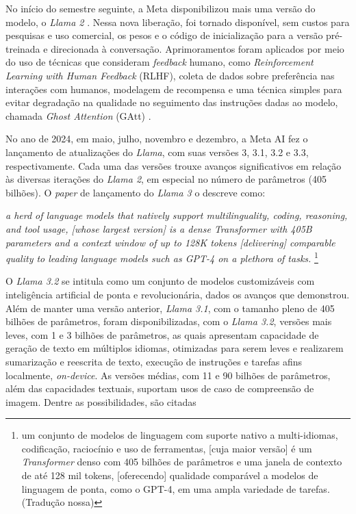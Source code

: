 No início do semestre seguinte, a Meta disponibilizou mais uma versão do modelo, o \textit{Llama 2} \cite{Llama:3}. Nessa nova liberação, foi tornado disponível, sem custos para pesquisas e uso comercial, os pesos e o código de inicialização para a versão pré-treinada e direcionada à conversação. Aprimoramentos foram aplicados por meio do uso de técnicas que consideram \textit{feedback} humano, como \textit{Reinforcement Learning with Human Feedback} (RLHF), coleta de dados sobre preferência nas interações com humanos,  modelagem de recompensa e uma técnica simples para evitar degradação na qualidade no seguimento das instruções dadas ao modelo, chamada \textit{Ghost Attention} (GAtt) \cite{Llama:4}.

No ano de 2024, em maio, julho, novembro e dezembro, a Meta AI fez o lançamento de atualizações do \textit{Llama}, com suas versões 3, 3.1, 3.2 e 3.3, respectivamente. Cada uma das versões trouxe avanços significativos em relação às diversas iterações do \textit{Llama 2}, em especial no número de parâmetros (405 bilhões). O \textit{paper} de lançamento do \textit{Llama 3} o descreve como:
\begin{citacao}
    \textit{a herd of language models that natively support multilinguality, coding, reasoning, and tool usage, [whose largest version] is a dense Transformer with 405B parameters and a context window of up to 128K tokens [delivering] comparable quality to leading language models such as GPT-4 on a plethora of tasks.} \cite{Llama:5} \footnote{um conjunto de modelos de linguagem com suporte nativo a multi-idiomas, codificação, raciocínio e uso de ferramentas, [cuja maior versão] é um \textit{Transformer} denso com 405 bilhões de parâmetros e uma janela de contexto de até 128 mil tokens, [oferecendo] qualidade comparável a modelos de linguagem de ponta, como o GPT-4, em uma ampla variedade de tarefas. (Tradução nossa)}
\end{citacao}


O \textit{Llama 3.2} se intitula como um conjunto de modelos customizáveis com inteligência artificial de ponta e revolucionária, dados os avanços que demonstrou. Além de manter uma versão anterior, \textit{Llama 3.1}, com o tamanho pleno de 405 bilhões de parâmetros, foram disponibilizadas, com o \textit{Llama 3.2}, versões mais leves, com 1 e 3 bilhões de parâmetros, as quais apresentam capacidade de geração de texto em múltiplos idiomas, otimizadas para serem leves e realizarem sumarização e reescrita de texto, execução de instruções e tarefas afins localmente, \textit{on-device}. As versões médias, com 11 e 90 bilhões de parâmetros, além das capacidades textuais, suportam usos de caso de compreensão de imagem. Dentre as possibilidades, são citadas

